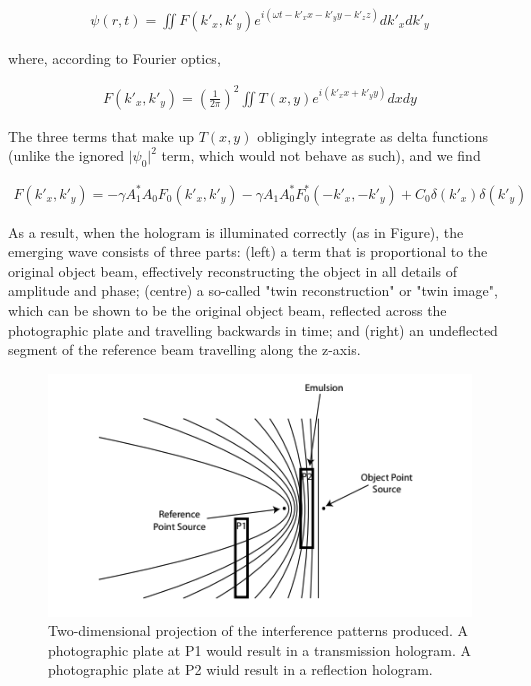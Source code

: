 \documentclass[12pt]{article}
\begin{document}
\vspace{-2ex}
\begin{gather*}
    \psi (r,t) = \iint F(k'_x,k'_y) e^{i(\omega t - k'_xx - k'_yy - k'_zz)} dk'_x dk'_y
\end{gather*}

where, according to Fourier optics,

\vspace{-2ex}
\begin{gather*}
    F(k'_x,k'_y) = \left( \frac{1}{2 \pi} \right)^2 \iint T(x,y) e^{i(k'_xx + k'_yy)} dxdy
\end{gather*}

The three terms that make up $T(x,y)$ obligingly integrate as delta functions (unlike the ignored $\lvert \psi_0 \rvert^2$ term, which would not behave as such), and we find

\vspace{-2ex}
\begin{gather*}
    F(k'_x,k'_y) = - \gamma A_1^* A_0 F_0 (k'_x,k'_y) - \gamma A_1 A_0^* F_0^* (-k'_x, -k'_y) + C_0 \delta (k'_x)\delta(k'_y)
\end{gather*}

As a result, when the hologram is illuminated correctly (as in Figure), the emerging wave consists of three parts: (left) a term that is proportional to the original object beam, effectively
reconstructing the object in all details of amplitude and phase; (centre) a so-called "twin reconstruction" or "twin image", which can be shown to be the original object beam, reflected across the
photographic plate and travelling backwards in time; and (right) an undeflected segment of the reference beam travelling along the z-axis.

\begin{figure}[H]
    \centering
    \includegraphics[width=.7\textwidth]{holography1.png}
    \caption{\centering Two-dimensional projection of the interference patterns produced. A photographic plate at P1 would result in a transmission hologram.
    A photographic plate at P2 wiuld result in a reflection hologram. \protect\cite{princetonholo}}
    \label{fig:3}
\end{figure}
\end{document}

